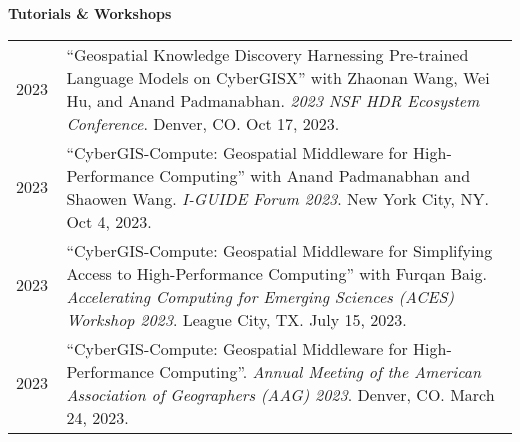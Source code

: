 \documentclass{acmcv}
\begin{document}
\begin{longtable}{p{0.1\linewidth} p{0.9\linewidth}}



    \end{longtable}
    \vspace*{-0.2cm}
    
    \pagebreak
    \textbf{Tutorials \& Workshops}
    \vspace*{-0.35cm}
    \begin{longtable}{p{0.1\linewidth} p{0.9\linewidth}}
        2023 & ``Geospatial Knowledge Discovery Harnessing Pre-trained Language Models on CyberGISX'' with Zhaonan Wang, Wei Hu, and Anand Padmanabhan. \textit{2023 NSF HDR Ecosystem Conference}. Denver, CO. Oct 17, 2023.\\

        2023 & ``CyberGIS-Compute: Geospatial Middleware for High-Performance Computing'' with Anand Padmanabhan and Shaowen Wang. \textit{I-GUIDE Forum 2023}. New York City, NY. Oct 4, 2023.\\

        2023 & ``CyberGIS-Compute: Geospatial Middleware for Simplifying Access to High-Performance Computing'' with Furqan Baig. \textit{Accelerating Computing for Emerging Sciences (ACES) Workshop 2023}. League City, TX. July 15, 2023.\\

        2023 & ``CyberGIS-Compute: Geospatial Middleware for High-Performance Computing''. \textit{Annual Meeting of the American Association of Geographers (AAG) 2023}. Denver, CO. March 24, 2023.\\

    \end{longtable}
    \vspace*{0.2cm}
\end{document}
